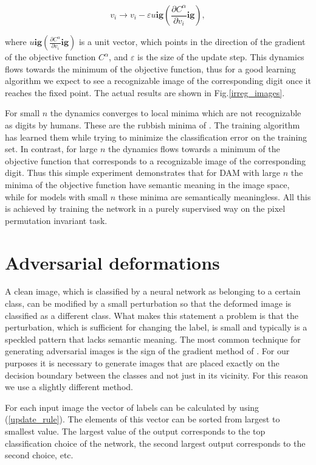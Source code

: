 \begin{equation}\label{gradient rule}
v_i \rightarrow v_i - \varepsilon u\mathbf{ig}( \frac{\partial C^\alpha}{\partial v_i}\mathbf{ig}),
\end{equation}

where $u\mathbf{ig}( \frac{\partial C^\alpha}{\partial v_i}\mathbf{ig})$ is a unit vector, which points in the direction of the gradient of the objective function $C^\alpha$, and $\varepsilon$ is the size of the update step. This dynamics flows towards the minimum of the objective function, thus for a good learning algorithm we expect to see a recognizable image of the corresponding digit once it reaches the fixed point. The actual results are shown in Fig.\ref{irreg_images}. 

For small $n$ the dynamics converges to local minima which are not recognizable as digits by humans. These are the rubbish minima of \cite{Nguyen}. The training algorithm has learned them while trying to minimize the classification error on the training set. In contrast, for large $n$ the dynamics flows towards a minimum of the objective function that corresponds to a recognizable image of the corresponding digit. Thus this simple experiment demonstrates that for DAM with large $n$ the minima of the objective function have semantic meaning in the image space, while for models with small $n$ these minima are semantically meaningless. All this is achieved by training the network in a purely supervised way on the pixel permutation invariant task.

\section{Adversarial deformations}\label{adversarial deformation section} A clean image, which is classified by a neural network as belonging to a certain class, can be modified by a small perturbation so that the deformed image is classified as a different class. What makes this statement a problem is that the perturbation, which is sufficient for changing the label, is small and typically is a speckled pattern that lacks semantic meaning. The most common technique for generating adversarial images is the sign of the gradient method of \cite{sign gradient}. For our purposes it is necessary to generate images that are placed exactly on the decision boundary between the classes and not just in its vicinity. For this reason we use a slightly different method. 

For each input image the vector of labels can be calculated by using (\ref{update_rule}). The elements of this vector can be sorted from largest to smallest value. The largest value of the output corresponds to the top classification choice of the network, the second largest output corresponds to the second choice, etc. 


